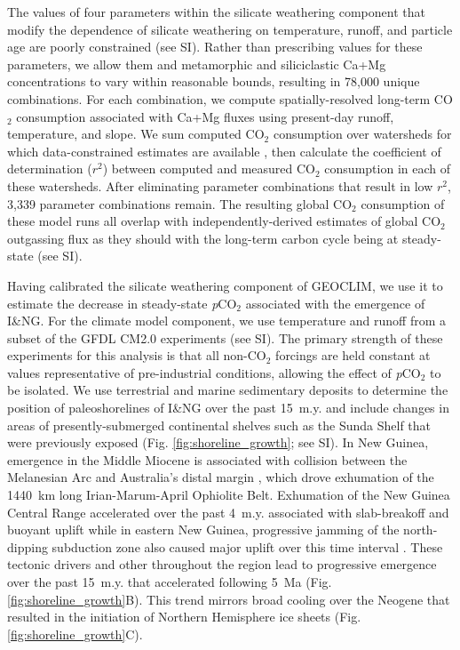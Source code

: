 \documentclass[11pt,letterpaper]{article}
\newcommand{\pCOtwo}{\textit{p}CO$_{2}$\xspace}
\newcommand{\COtwo}{CO$_{2}$\xspace}
\begin{document}
The values of four parameters within the silicate weathering component \cite{Gabet2009a, West2012a, Maffre2018a} that modify the dependence of silicate weathering on temperature, runoff, and particle age are poorly constrained (see SI). Rather than prescribing values for these parameters, we allow them and metamorphic and siliciclastic Ca+Mg concentrations to vary within reasonable bounds, resulting in 78,000 unique combinations. For each combination, we compute spatially-resolved long-term \COtwo consumption associated with Ca+Mg fluxes using present-day runoff, temperature, and slope. We sum computed \COtwo consumption over watersheds for which data-constrained estimates are available \cite{Gaillardet1999a, Moquet2018a}, then calculate the coefficient of determination ($r^{2}$) between computed and measured \COtwo consumption in each of these watersheds. After eliminating parameter combinations that result in low $r^{2}$, 3,339 parameter combinations remain. The resulting global \COtwo consumption of these model runs all overlap with independently-derived estimates of global \COtwo outgassing flux \cite{Gerlach2011a} as they should with the long-term carbon cycle being at steady-state (see SI).

Having calibrated the silicate weathering component of GEOCLIM, we use it to estimate the decrease in steady-state \pCOtwo associated with the emergence of I\&NG. For the climate model component, we use temperature and runoff from a subset of the GFDL CM2.0 experiments \cite{Delworth2006a, Delworth2006b} (see SI). The primary strength of these experiments for this analysis is that all non-\COtwo forcings are held constant at values representative of pre-industrial conditions, allowing the effect of \pCOtwo to be isolated. We use terrestrial and marine sedimentary deposits to determine the position of paleoshorelines of I\&NG over the past 15~m.y. and include changes in areas of presently-submerged continental shelves such as the Sunda Shelf that were previously exposed (Fig. \ref{fig:shoreline_growth}; see SI). In New Guinea, emergence in the Middle Miocene is associated with collision between the Melanesian Arc and Australia's distal margin \cite{vanUfford2005a, Cloos2005a, Baldwin2012a}, which drove exhumation of the 1440~km long Irian-Marum-April Ophiolite Belt. Exhumation of the New Guinea Central Range accelerated over the past 4~m.y. associated with slab-breakoff and buoyant uplift \cite{Cloos2005a} while in eastern New Guinea, progressive jamming of the north-dipping subduction zone also caused major uplift over this time interval \cite{vanUfford2005a}. These tectonic drivers and other throughout the region lead to progressive emergence over the past 15~m.y. that accelerated following 5~Ma (Fig. \ref{fig:shoreline_growth}B). This trend mirrors broad cooling over the Neogene that resulted in the initiation of Northern Hemisphere ice sheets (Fig. \ref{fig:shoreline_growth}C).
\end{document}

